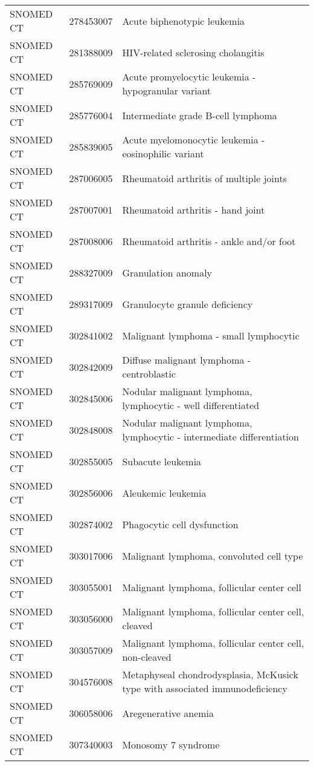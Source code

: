 \begin{longtable}{p{}p{}p{}}
  SNOMED CT & 278453007 & Acute biphenotypic leukemia \\ 
  SNOMED CT & 281388009 & HIV-related sclerosing cholangitis \\ 
  SNOMED CT & 285769009 & Acute promyelocytic leukemia - hypogranular variant \\ 
  SNOMED CT & 285776004 & Intermediate grade B-cell lymphoma \\ 
  SNOMED CT & 285839005 & Acute myelomonocytic leukemia - eosinophilic variant \\ 
  SNOMED CT & 287006005 & Rheumatoid arthritis of multiple joints \\ 
  SNOMED CT & 287007001 & Rheumatoid arthritis - hand joint \\ 
  SNOMED CT & 287008006 & Rheumatoid arthritis - ankle and/or foot \\ 
  SNOMED CT & 288327009 & Granulation anomaly \\ 
  SNOMED CT & 289317009 & Granulocyte granule deficiency \\ 
  SNOMED CT & 302841002 & Malignant lymphoma - small lymphocytic \\ 
  SNOMED CT & 302842009 & Diffuse malignant lymphoma - centroblastic \\ 
  SNOMED CT & 302845006 & Nodular malignant lymphoma, lymphocytic - well differentiated \\ 
  SNOMED CT & 302848008 & Nodular malignant lymphoma, lymphocytic - intermediate differentiation \\ 
  SNOMED CT & 302855005 & Subacute leukemia \\ 
  SNOMED CT & 302856006 & Aleukemic leukemia \\ 
  SNOMED CT & 302874002 & Phagocytic cell dysfunction \\ 
  SNOMED CT & 303017006 & Malignant lymphoma, convoluted cell type \\ 
  SNOMED CT & 303055001 & Malignant lymphoma, follicular center cell \\ 
  SNOMED CT & 303056000 & Malignant lymphoma, follicular center cell, cleaved \\ 
  SNOMED CT & 303057009 & Malignant lymphoma, follicular center cell, non-cleaved \\ 
  SNOMED CT & 304576008 & Metaphyseal chondrodysplasia, McKusick type with associated immunodeficiency \\ 
  SNOMED CT & 306058006 & Aregenerative anemia \\ 
  SNOMED CT & 307340003 & Monosomy 7 syndrome \\ 

\end{longtable}

